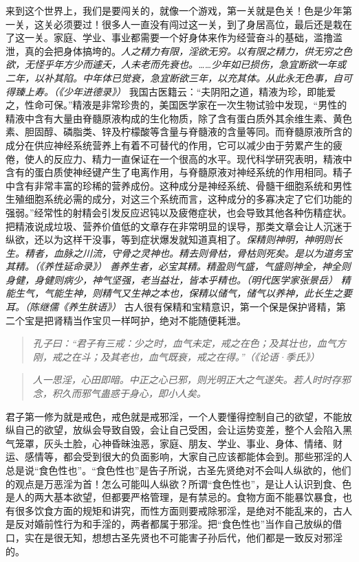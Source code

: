 来到这个世界上，我们是要闯关的，就像一个游戏，第一关就是色关！色是少年第一关，这关必须要过！很多人一直没有闯过这一关，到了身居高位，最后还是栽在了这一关。家庭、学业、事业都需要一个好身体来作为经营奋斗的基础，滥撸滥泄，真的会把身体搞垮的。\textit{人之精力有限，淫欲无穷。以有限之精力，供无穷之色欲，无怪乎年方少而遽夭，人未老而先衰也。……少年如已损伤，急宜断欲一年或二年，以补其陷。中年体已觉衰，急宜断欲三年，以充其体。从此永无色事，自可得臻上寿。（《少年进德录》）} 我国古医籍云：“夫阴阳之道，精液为珍，即能爱之，性命可保。”精液是非常珍贵的，美国医学家在一次生物试验中发现，“男性的精液中含有大量由脊髓原液构成的生化物质，除了含有蛋白质外其余维生素、黄色素、胆固醇、磷脂类、锌及柠檬酸等含量与脊髓液的含量等同。而脊髓原液所含的成分在供应神经系统营养上有着不可替代的作用，它可以减少由于劳累产生的疲倦，使人的反应力、精力一直保证在一个很高的水平。现代科学研究表明，精液中含有的蛋白质使神经键产生了电离作用，与脊髓原液对神经系统的作用相同。精子中含有非常丰富的珍稀的营养成份。这种成分是神经系统、骨髓干细胞系统和男性生殖细胞系统必需的成分，对这三个系统而言，这种成分的多寡决定了它们功能的强弱。”经常性的射精会引发反应迟钝以及疲倦症状，也会导致其他各种伤精症状。把精液说成垃圾、营养价值低的文章存在非常明显的误导，那类文章会让人沉迷于纵欲，还以为这样干没事，等到症状爆发就知道真相了。\textit{保精则神明，神明则长生。精者，血脉之川流，守骨之灵神也。精去则骨枯，骨枯则死矣。是以为道务宝其精。（《养性延命录》）} \textit{善养生者，必宝其精。精盈则气盛，气盛则神全，神全则身健，身健则病少，神气坚强，老当益壮，皆本乎精也。（明代医学家张景岳）} \textit{精能生气，气能生神，则精气又生神之本也，保精以储气，储气以养神，此长生之要耳。（陈继儒《养生肤语》）} 古人很有保精和宝精意识，第一个保是保护肾精，第二个宝是把肾精当作宝贝一样呵护，绝对不能随便耗泄。

\begin{quote}\it
    孔子曰：“君子有三戒：少之时，血气未定，戒之在色；及其壮也，血气方刚，戒之在斗；及其老也，血气既衰，戒之在得。”（《论语·季氏》）
\end{quote}

\begin{quote}\it
    人一思淫，心田即暗。中正之心已邪，则光明正大之气遂失。若人时时存邪念，积久而邪气蛊惑于身心，即小人矣。
\end{quote}

君子第一修为就是戒色，戒色就是戒邪淫，一个人要懂得控制自己的欲望，不能放纵自己的欲望，放纵会导致自毁，会让自己受困，会让运势变差，整个人会陷入黑气笼罩，灰头土脸，心神昏昧浊恶，家庭、朋友、学业、事业、身体、情绪、财运、感情等，都会受到很大的负面影响，大家自己应该都能体会到。那些邪淫的人总是说“食色性也”。“食色性也”是告子所说，古圣先贤绝对不会叫人纵欲的，他们的观点是万恶淫为首！怎么可能叫人纵欲？所谓“食色性也”，是让人认识到食、色是人的两大基本欲望，但都要严格管理，是有禁忌的。食物方面不能暴饮暴食，也有很多饮食方面的规矩和讲究，而性方面则要戒除邪淫，是绝对不能乱来的，古人是反对婚前性行为和手淫的，两者都属于邪淫。把“食色性也”当作自己放纵的借口，实在是很无知，想想古圣先贤也不可能害子孙后代，他们都是一致反对邪淫的。

